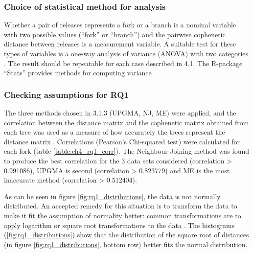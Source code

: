 \subsubsection{Choice of statistical method for analysis}
Whether a pair of releases represents a fork or a branch is a nominal variable with two possible values (“fork” or “branch”) and the pairwise cophenetic distance between releases is a measurement variable. A suitable test for these types of variables is a one-way analysis of variance (ANOVA) with two categories \citep{McDonald2014b}. The result should be repeatable for each case described in 4.1. The R-package “Stats” provides methods for computing variance \citep[p.1211]{RDevelopmentCoreTeam2008a}.

\subsubsection{Checking assumptions for RQ1}


\noindent
The three methods chosen in 3.1.3 (UPGMA, NJ, ME) were applied, and the correlation between the distance matrix and the cophenetic matrix obtained from each tree was used as a measure of how accurately the trees represent the distance matrix \citep{Rohlf2013a}. Correlations (Pearson's Chi-squared test) were calculated for each fork (table \ref{table:ch4_rq1_corr}). The Neighbour-Joining method was found to produce the best correlation for the 3 data sets considered (correlation > 0.991086), UPGMA is second (correlation > 0.823779) and ME is the most inaccurate method (correlation > 0.512404).




\noindent
As can be seen in figure \ref{fig:rq1_distributions}, the data is not normally distributed. An accepted remedy for this situation is to transform the data to make it fit the assumption of normality better: common transformations are to apply logarithm or square root transformations to the data \citep[p.141]{McDonald2014b}. The histograms (\ref{fig:rq1_distributions}) show that the distribution of the square root of distances (in figure \ref{fig:rq1_distributions}, bottom row) better fits the normal distribution.

